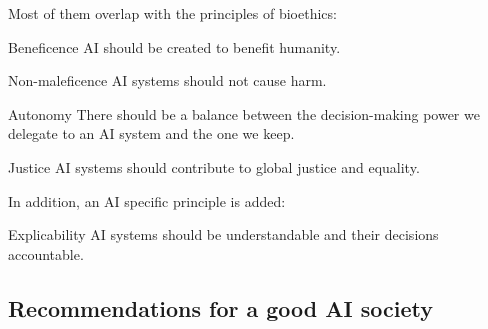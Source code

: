 Most of them overlap with the principles of bioethics:
\begin{descriptionlist}
    \item[Beneficence] 
        AI should be created to benefit humanity.

    \item[Non-maleficence] 
        AI systems should not cause harm.
    
    \item[Autonomy] 
        There should be a balance between the decision-making power we delegate to an AI system and the one we keep.
    
    \item[Justice] 
        AI systems should contribute to global justice and equality.
\end{descriptionlist}

In addition, an AI specific principle is added:
\begin{descriptionlist}
    \item[Explicability] 
        AI systems should be understandable and their decisions accountable.
\end{descriptionlist}


\subsection{Recommendations for a good AI society}

